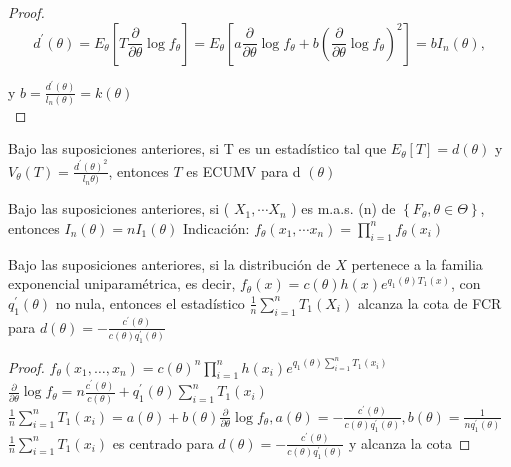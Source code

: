 \begin{proof}
  $$
    d^{\prime}(\theta)=E_{\theta}\left[T \frac{\partial}{\partial \theta} \log f_{\theta}\right]=E_{\theta}\left[a \frac{\partial}{\partial \theta} \log f_{\theta}+b\left(\frac{\partial}{\partial \theta} \log f_{\theta}\right)^{2}\right]=b I_{n}(\theta),
  $$

  y $b=\frac{d^{\prime}(\theta)}{l_{n}(\theta)}=k(\theta)$\\
\end{proof}

\begin{proposición}
Bajo las suposiciones anteriores, si T es un estadístico tal que
$E_{\theta}[T]=d(\theta)$ y $V_{\theta}(T)=\frac{d^{\prime}(\theta)^{2}}{l_{n} \theta)}$, entonces $T$ es ECUMV para d $(\theta)$
\end{proposición}

\begin{proposición}
Bajo las suposiciones anteriores, si ( $X_{1}, \cdots X_{n}$ ) es
m.a.s. (n) de $\left\{F_{\theta}, \theta \in \Theta\right\}$, entonces
$I_{n}(\theta)=n I_{1}(\theta)$ Indicación: $f_{\theta}\left(x_{1}, \cdots
  x_{n}\right)=\prod_{i=1}^{n} f_{\theta}\left(x_{i}\right)$
\end{proposición}

\begin{proposición}
Bajo las suposiciones anteriores, si la distribución de $X$ pertenece a la familia exponencial uniparamétrica, es decir, $f_{\theta}(x)=c(\theta) h(x) e^{q_{1}(\theta) T_{1}(x)}$, con $q_{1}^{\prime}(\theta)$ no nula, entonces el estadístico $\frac{1}{n} \sum_{i=1}^{n} T_{1}\left(X_{i}\right)$ alcanza la cota de FCR para $d(\theta)=-\frac{c^{\prime}(\theta)}{c(\theta) q_{1}^{\prime}(\theta)}$
\end{proposición}

\begin{proof}
  $f_{\theta}\left(x_{1}, \ldots, x_{n}\right)=c(\theta)^{n} \prod_{i=1}^{n} h\left(x_{i}\right) e^{q_{1}(\theta) \sum_{i=1}^{n} T_{1}\left(x_{i}\right)}$\\
  $\frac{\partial}{\partial \theta} \log f_{\theta}=n \frac{c^{\prime}(\theta)}{c(\theta)}+q_{1}^{\prime}(\theta) \sum_{i=1}^{n} T_{1}\left(x_{i}\right)$\\
  $\frac{1}{n} \sum_{i=1}^{n} T_{1}\left(x_{i}\right)=a(\theta)+b(\theta) \frac{\partial}{\partial \theta} \log f_{\theta}, a(\theta)=-\frac{c^{\prime}(\theta)}{c(\theta) q_{1}^{\prime}(\theta)}, b(\theta)=\frac{1}{n q_{1}^{\prime}(\theta)}$\\
  $\frac{1}{n} \sum_{i=1}^{n} T_{1}\left(x_{i}\right)$ es centrado para $d(\theta)=-\frac{c^{\prime}(\theta)}{c(\theta) q_{1}^{\prime}(\theta)}$ y alcanza la cota

\end{proof}

